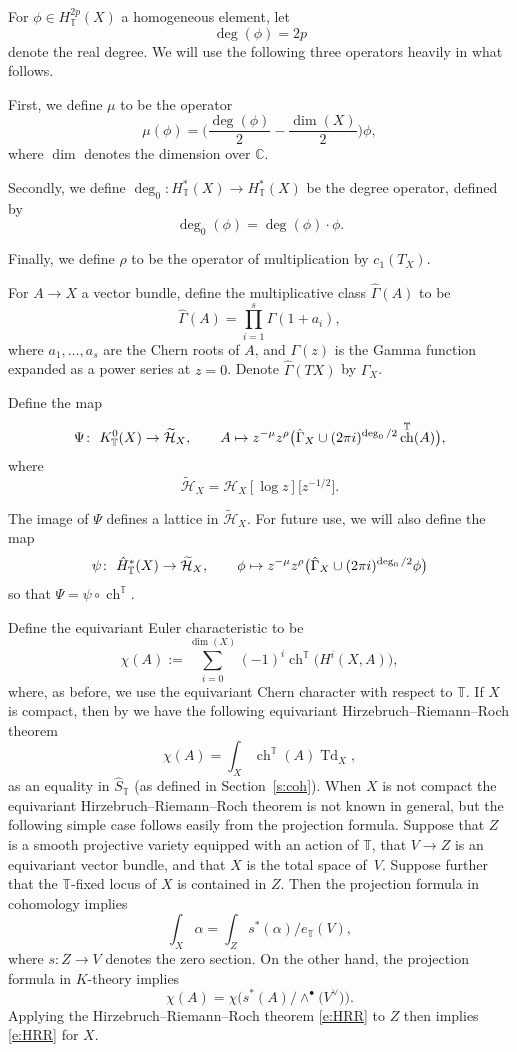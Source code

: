 \documentclass[11pt]{article}
\numberwithin{equation}{section}
\numberwithin{equation}{section}
\newcommand{\cc}[1]{\mathcal{#1}} %
\newcommand{\CC}{\mathbb{C}}
\newcommand{\torus}{\mathbb{T}}
\DeclareMathOperator{\ch}{ch}
\newcommand{\op}[1]{\operatorname{#1}}
\begin{document}
For $\phi \in H^{2p}_\torus(X)$ a homogeneous element, let
\[
\deg(\phi) = 2p
\]
denote the real degree.
We will use the following three operators heavily in what follows.

First, we define $\mu$ to be the operator
\[
\mu(\phi) = \biggl(\frac{\deg(\phi)}{2} - \frac{\dim(X)}{2}\biggr)\phi,
\]
where $\dim$ denotes the dimension over $\CC$.

Secondly, we define $\deg_0\colon H^*_\torus(X) \to H^*_\torus(X)$ be the degree operator, defined by
\[
\deg_0(\phi) = \deg(\phi)\cdot \phi.
\]


Finally, we define $\rho$ to be the operator of multiplication by $c_1(T_X)$.

For $A \to X$ a vector bundle, define the multiplicative class $\hat \Gamma(A)$ to be
\[
\hat \Gamma(A) = \prod_{i=1}^s \Gamma(1 + a_i),
\]
where $a_1, \dots, a_s$ are the Chern roots of $A$, and $\Gamma(z)$ is the Gamma function expanded as a power series at $z = 0$. Denote $\hat \Gamma(TX)$ by $\hat \Gamma_{X}$.

Define the map
\begin{align*}
\Psi\colon \ K^0_\torus(X) \to \widetilde{\cc H}_X, \qquad
A \mapsto z^{- \mu} z^{\rho} \bigl( \hat \Gamma_X \cup (2 \pi {\rm i})^{\op{deg}_0/2} \ch^\torus(A) \bigr),
\end{align*}
where
\[
\widetilde{\cc H}_X = \cc H_X[\log z]\big[z^{-1/2}\big].
\]

The image of $\Psi$ defines a lattice in $\widetilde{\cc H}_X$. For future use, we will also define the map
\begin{align}
\psi\colon \ \hat H^*_\torus(X) \to \widetilde{\cc H}_X, \qquad
\phi \mapsto z^{- \mu} z^{\rho} \bigl( \hat \Gamma_X \cup (2 \pi {\rm i})^{\op{deg}_0/2} \phi \bigr)\label{psi}
\end{align}
so that $\Psi = \psi \circ \ch^\torus$.

Define the equivariant Euler characteristic to be
\[
\chi(A) := \sum_{i=0}^{\dim(X)} (-1)^i \ch^\torus\bigl(H^i(X, A)\bigr),
\]
where, as before, we use the equivariant Chern character with respect to $\torus$.
If $X$ is compact, then by \cite{EG, Thomason} we have the following equivariant Hirzebruch--Riemann--Roch theorem
\begin{equation}\label{e:HRR}\chi(A) = \int_X \ch^\torus(A) \op{Td}_X,\end{equation}
as an equality in $\hat S_\torus$ (as defined in Section~\ref{s:coh}).
 When $X$ is not compact the equivariant Hirzebruch--Riemann--Roch theorem is not known in general, but the following simple case follows easily from the projection formula.
Suppose that $Z$ is a smooth projective variety equipped with an action of $\torus$, that $V \to Z$ is an equivariant vector bundle, and that $X$ is the total space of~$V$. Suppose further that the $\torus$-fixed locus of $X$ is contained in $Z$.
Then the projection formula in cohomology implies
\[
\int_X \alpha = \int_Z s^*(\alpha)/e_\torus(V),
\]
where $s\colon Z \to V$ denotes the zero section.
On the other hand, the projection formula in $K$-theory implies
\[
\chi(A) = \chi\bigl(s^*(A)/\wedge^\bullet\bigl(V^\vee\bigr)\bigr).
\]
Applying the Hirzebruch--Riemann--Roch theorem \eqref{e:HRR} to $Z$ then implies \eqref{e:HRR} for $X$.
\end{document}
